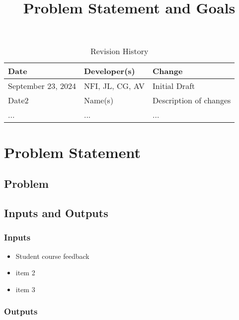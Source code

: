 \documentclass{article}
\title{Problem Statement and Goals\\\progname}
\author{\authname}
\date{}
\begin{document}
\maketitle

\begin{table}[hp]
\caption{Revision History} \label{TblRevisionHistory}
\begin{tabularx}{\textwidth}{llX}
\toprule
\textbf{Date} & \textbf{Developer(s)} & \textbf{Change}\\
\midrule
September 23, 2024 & NFI, JL, CG, AV & Initial Draft\\
Date2 & Name(s) & Description of changes\\
... & ... & ...\\
\bottomrule
\end{tabularx}
\end{table}

\section{Problem Statement}



\subsection{Problem}

\subsection{Inputs and Outputs}

\subsubsection{Inputs}

\begin{itemize}
    \item Student course feedback
    \item item 2
    \item item 3
\end{itemize}

\subsubsection{Outputs}
\end{document}
